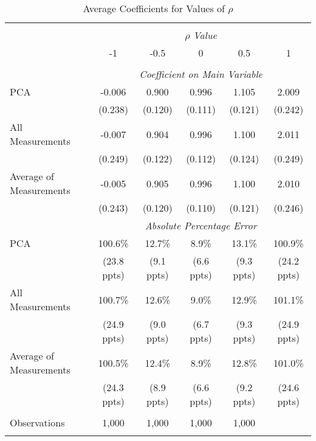 \begin{table}[!htbp] \centering
  \caption{Average Coefficients for Values of $\rho$ \label{sim_rho_3}}
\begin{tabular}{@{\extracolsep{5pt}}lccccc}
\\[-1.8ex]\hline
\hline \\[-1.8ex]
& \multicolumn{5}{c}{$\rho$ \textit{ Value}} \
\cr 
\\[-1.8ex] & -1 & -0.5 & 0 & 0.5 & 1 \\
\hline \\[-1.8ex]
& \multicolumn{5}{c}{\textit{Coefficient on Main Variable}} \\
 PCA & -0.006 & 0.900 & 0.996 & 1.105 & 2.009  \\
  & (0.238) & (0.120) & (0.111) & (0.121) & (0.242)\\
 All Measurements & -0.007 & 0.904 & 0.996 & 1.100 & 2.011  \\
  & (0.249) & (0.122) & (0.112) & (0.124) & (0.249)\\
 Average of Measurements & -0.005 & 0.905 & 0.996 & 1.100 & 2.010  \\
  & (0.243) & (0.120) & (0.110) & (0.121) & (0.246)\\
& \multicolumn{5}{c}{\textit{Absolute Percentage Error}} \\
  PCA & 100.6\% & 12.7\% & 8.9\% & 13.1\% & 100.9\% \\
   & (23.8 ppts) & (9.1 ppts) & (6.6 ppts) & (9.3 ppts) & (24.2 ppts)\\
All Measurements & 100.7\% & 12.6\% & 9.0\% & 12.9\% & 101.1\%  \\
  & (24.9 ppts) & (9.0 ppts) & (6.7 ppts) & (9.3 ppts) & (24.9 ppts)\\
  Average of Measurements & 100.5\% & 12.4\% & 8.9\% & 12.8\% & 101.0\% \\
  & (24.3 ppts) & (8.9 ppts) & (6.6 ppts) & (9.2 ppts) & (24.6 ppts)\\
  \hline \\[-1.8ex]
 Observations & 1,000 & 1,000 & 1,000 & 1,000 &\\
\hline
\hline \\[-1.8ex]
\end{tabular}
\end{table}